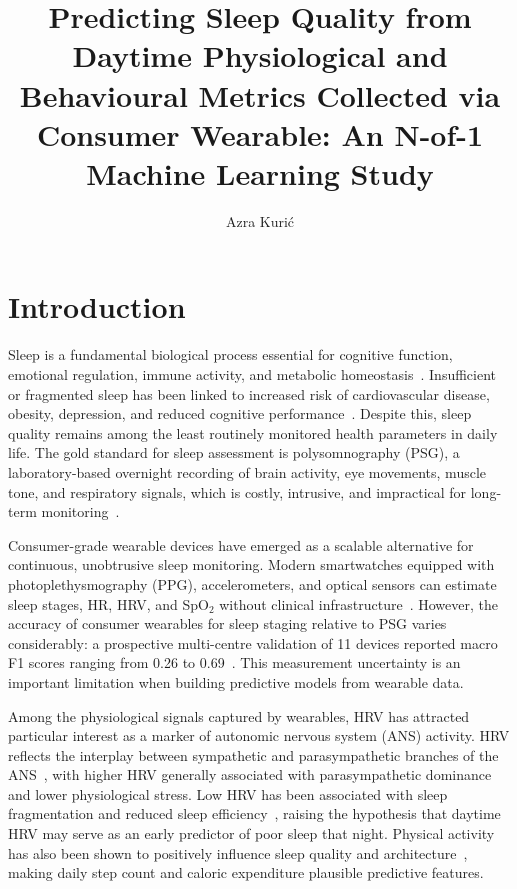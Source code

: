 \documentclass[fleqn,10pt]{wlscirep}
\title{Predicting Sleep Quality from Daytime Physiological and Behavioural Metrics Collected via Consumer Wearable: An N-of-1 Machine Learning Study}
\author[1]{Azra Kurić}
\affil[1]{Faculty of Electrical Engineering, University of Sarajevo, Sarajevo, Bosnia and Herzegovina}
\begin{document}
\flushbottom
\maketitle
\thispagestyle{empty}

\section*{Introduction}

Sleep is a fundamental biological process essential for cognitive function, emotional regulation, immune activity, and metabolic homeostasis~\cite{worley2018}. Insufficient or fragmented sleep has been linked to increased risk of cardiovascular disease, obesity, depression, and reduced cognitive performance~\cite{alnawwar2023}. Despite this, sleep quality remains among the least routinely monitored health parameters in daily life. The gold standard for sleep assessment is polysomnography (PSG), a laboratory-based overnight recording of brain activity, eye movements, muscle tone, and respiratory signals, which is costly, intrusive, and impractical for long-term monitoring~\cite{rundo2019}.

Consumer-grade wearable devices have emerged as a scalable alternative for continuous, unobtrusive sleep monitoring. Modern smartwatches equipped with photoplethysmography (PPG), accelerometers, and optical sensors can estimate sleep stages, HR, HRV, and SpO$_2$ without clinical infrastructure~\cite{leeTW2023}. However, the accuracy of consumer wearables for sleep staging relative to PSG varies considerably: a prospective multi-centre validation of 11 devices reported macro F1 scores ranging from 0.26 to 0.69~\cite{leeTW2023}. This measurement uncertainty is an important limitation when building predictive models from wearable data.

Among the physiological signals captured by wearables, HRV has attracted particular interest as a marker of autonomic nervous system (ANS) activity. HRV reflects the interplay between sympathetic and parasympathetic branches of the ANS~\cite{herhaus2022}, with higher HRV generally associated with parasympathetic dominance and lower physiological stress. Low HRV has been associated with sleep fragmentation and reduced sleep efficiency~\cite{hayano2022}, raising the hypothesis that daytime HRV may serve as an early predictor of poor sleep that night. Physical activity has also been shown to positively influence sleep quality and architecture~\cite{alnawwar2023}, making daily step count and caloric expenditure plausible predictive features.
\end{document}
